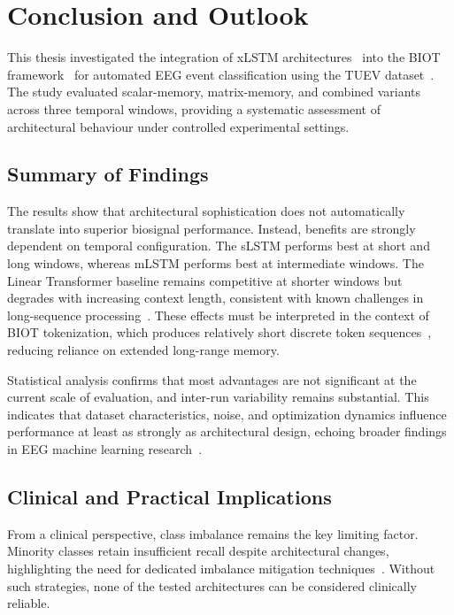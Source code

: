 \cleardoubleoddpage
\chapter{Conclusion and Outlook}
\label{sec:conclusion}

This thesis investigated the integration of \ac{xLSTM} architectures~\cite{beck2024xlstm} into the \ac{BIOT} framework~\cite{yang2023biot} for automated \ac{EEG} event classification using the \ac{TUEV} dataset~\cite{harati2015improved,obeid2016temple,ferrell2022electrode}. The study evaluated scalar-memory, matrix-memory, and combined variants across three temporal windows, providing a systematic assessment of architectural behaviour under controlled experimental settings.

\section{Summary of Findings}

The results show that architectural sophistication does not automatically translate into superior biosignal performance. Instead, benefits are strongly dependent on temporal configuration. The \ac{sLSTM} performs best at short and long windows, whereas \ac{mLSTM} performs best at intermediate windows. The Linear Transformer baseline remains competitive at shorter windows but degrades with increasing context length, consistent with known challenges in long-sequence processing~\cite{katharopoulos2020transformers}. These effects must be interpreted in the context of \ac{BIOT} tokenization, which produces relatively short discrete token sequences~\cite{yang2023biot}, reducing reliance on extended long-range memory.

Statistical analysis confirms that most advantages are not significant at the current scale of evaluation, and inter-run variability remains substantial. This indicates that dataset characteristics, noise, and optimization dynamics influence performance at least as strongly as architectural design, echoing broader findings in \ac{EEG} machine learning research~\cite{banville2022robust}.

\section{Clinical and Practical Implications}

From a clinical perspective, class imbalance remains the key limiting factor. Minority classes retain insufficient recall despite architectural changes, highlighting the need for dedicated imbalance mitigation techniques~\cite{cui2019class,lin2017focal}. Without such strategies, none of the tested architectures can be considered clinically reliable.

